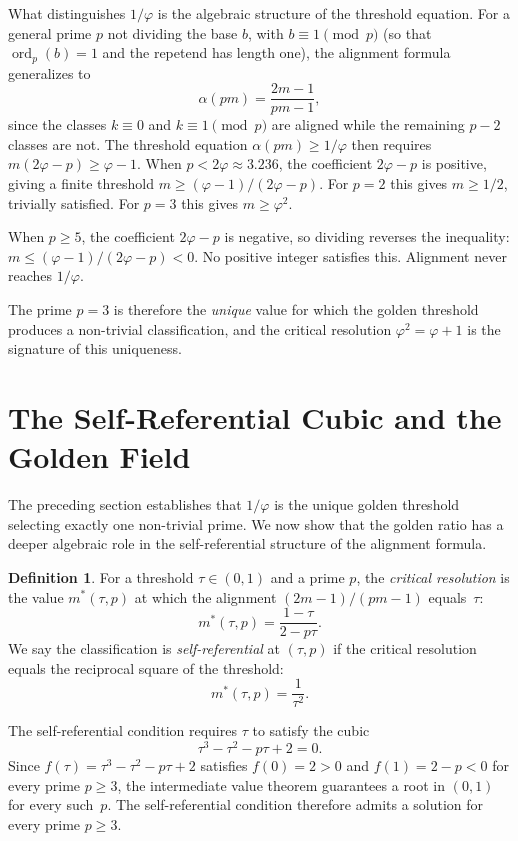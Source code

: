 \documentclass[12pt]{amsart}
\theoremstyle{definition}
\newtheorem{definition}[theorem]{Definition}
\theoremstyle{remark}
\begin{document}
What distinguishes $1/\varphi$ is the algebraic structure of the
threshold equation. For a general prime $p$ not dividing the base $b$,
with $b \equiv 1 \pmod{p}$ (so that $\operatorname{ord}_{p}(b) = 1$
and the repetend has length one), the alignment formula generalizes to
\[
\alpha(pm) = \frac{2m-1}{pm-1},
\]
since the classes $k \equiv 0$ and $k \equiv 1 \pmod{p}$ are aligned
while the remaining $p{-}2$ classes are not. The threshold equation
$\alpha(pm) \ge 1/\varphi$ then requires
$m(2\varphi - p) \ge \varphi - 1$.
When $p < 2\varphi \approx 3.236$, the coefficient
$2\varphi - p$ is positive, giving a finite threshold
$m \ge (\varphi - 1)/(2\varphi - p)$.
For $p = 2$ this gives $m \ge 1/2$, trivially satisfied.
For $p = 3$ this gives $m \ge \varphi^2$.

When $p \ge 5$, the coefficient $2\varphi - p$ is negative,
so dividing reverses the inequality:
$m \le (\varphi - 1)/(2\varphi - p) < 0$.
No positive integer satisfies this. Alignment never
reaches $1/\varphi$.

The prime $p = 3$ is therefore the \emph{unique} value for which the
golden threshold produces a non-trivial classification, and the critical
resolution $\varphi^{2} = \varphi + 1$ is the signature of this
uniqueness.

\section{The Self-Referential Cubic and the Golden Field}

The preceding section establishes that $1/\varphi$ is the unique
golden threshold selecting exactly one non-trivial prime. We now show
that the golden ratio has a deeper algebraic role in the
self-referential structure of the alignment formula.

\begin{definition}
For a threshold $\tau \in (0,1)$ and a prime $p$, the \emph{critical
resolution} is the value $m^{*}(\tau, p)$ at which the alignment
$(2m{-}1)/(pm{-}1)$ equals~$\tau$:
\[
m^{*}(\tau,p) = \frac{1-\tau}{2-p\tau}.
\]
We say the classification is \emph{self-referential} at $(\tau,p)$ if
the critical resolution equals the reciprocal square of the threshold:
\[
m^{*}(\tau,p) = \frac{1}{\tau^{2}}.
\]
\end{definition}

The self-referential condition requires $\tau$ to satisfy the cubic
\begin{equation}\label{eq:cubic}
\tau^{3} - \tau^{2} - p\tau + 2 = 0.
\end{equation}
Since $f(\tau) = \tau^{3} - \tau^{2} - p\tau + 2$ satisfies
$f(0) = 2 > 0$ and $f(1) = 2 - p < 0$ for every prime $p \ge 3$,
the intermediate value theorem guarantees a root in $(0,1)$ for every
such~$p$. The self-referential condition therefore admits a solution
for every prime $p \ge 3$.
\end{document}
